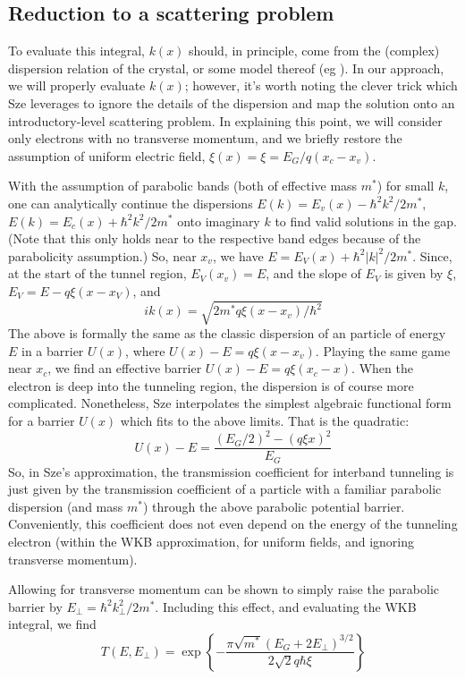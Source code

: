 \subsection{Reduction to a scattering problem}
To evaluate this integral, $k(x)$ should, in principle, come from the (complex) dispersion relation of the crystal, or some model thereof (eg \cite{Guan_2011}).  In our approach, we will properly evaluate $k(x)$; however, it's worth noting the clever trick which Sze leverages to ignore the details of the dispersion and map the solution onto an introductory-level scattering problem.  In explaining this point, we will consider only electrons with no transverse momentum, and we briefly restore the assumption of uniform electric field, $\xi(x)=\xi=E_G/q(x_c-x_v)$.

With the assumption of parabolic bands (both of effective mass $m^*$) for small $k$, one can  analytically continue the dispersions $E(k)=E_v(x)-\hbar^2k^2/2m^*$, $E(k)=E_c(x)+\hbar^2k^2/2m^*$ onto imaginary $k$ to find valid solutions in the gap.  (Note that this only holds near to the respective band edges because of the parabolicity assumption.)  So, near $x_v$, we have $E=E_V(x)+\hbar^2|k|^2/2m^*$.  Since, at the start of the tunnel region, $E_V(x_v)=E$, and the slope of $E_V$ is given by $\xi$, $E_V=E-q\xi(x-x_V)$, and
$$ik(x)=\sqrt{2m^*q\xi(x-x_v)/\hbar^2}$$
The above is formally the same as the classic dispersion of an particle of energy $E$ in a barrier $U(x)$, where $U(x)-E=q\xi(x-x_v)$.  Playing the same game near $x_c$, we find an effective barrier $U(x)-E=q\xi(x_c-x)$.  When the electron is deep into the tunneling region, the dispersion is of course more complicated.  Nonetheless, Sze interpolates the simplest algebraic functional form for a barrier $U(x)$ which fits to the above limits.  That is the quadratic:
$$U(x)-E=\frac{(E_G/2)^2-(q\xi x)^2}{E_G}$$
So, in Sze's approximation, the transmission coefficient for interband tunneling is just given by the transmission coefficient of a particle with a familiar parabolic dispersion (and mass $m^*$) through the above parabolic potential barrier.  Conveniently, this coefficient does not even depend on the energy of the tunneling electron (within the WKB approximation, for uniform fields, and ignoring transverse momentum).

Allowing for transverse momentum can be shown to simply raise the parabolic barrier by $E_\perp=\hbar^2k_\perp^2/2m^*$.  Including this effect, and evaluating the WKB integral, we find
$$T(E,E_\perp)=\exp\left\{-\frac{\pi\sqrt{m^*}(E_G+2E_\perp)^{3/2}}{2\sqrt{2}q\hbar\xi}\right\}$$